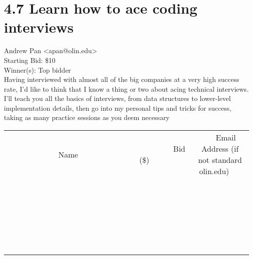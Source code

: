 \documentclass[11pt]{article}
\begin{document}
					\section*{4.7 Learn how to ace coding interviews}
					Andrew Pan <apan@olin.edu> \\
					Starting Bid: \$10 \\
					Winner(s): Top bidder \\
					Having interviewed with almost all of the big companies at a very high success rate, I'd like to think that I know a thing or two about acing technical interviews.  I'll teach you all the basics of interviews, from data structures to lower-level implementation details, then go into my personal tips and tricks for success, taking as many practice sessions as you deem necessary \\
					[6ex]
					\begin{tabular}{c c c}
						~~~~~~~~~~~~~Name~~~~~~~~~~~~~ & ~~~~~~~~~Bid (\$)~~~~~~~~~ & ~~~Email Address (if not standard olin.edu)~~~ \\
				
 & & \\
\hline
 & & \\
\hline
 & & \\
\hline
 & & \\
\hline
 & & \\
\hline
 & & \\
\hline
 & & \\
\hline
 & & \\
\hline
 & & \\
\hline
 & & \\
\hline
 & & \\
\hline
 & & \\
\hline
 & & \\
\hline
 & & \\
\hline
 & & \\
\hline
 & & \\
\hline
 & & \\
\hline
 & & \\
\hline
 & & \\
\hline
 & & \\
\hline
 & & \\
\hline
 & & \\
\hline
 & & \\
\hline
 & & \\
\hline
 & & \\
\hline
 & & \\
\hline
					\end{tabular}
					\clearpage
				
\end{document}
